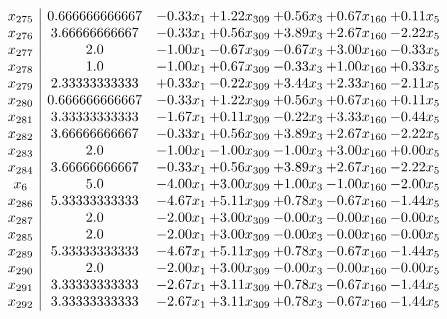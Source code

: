 \documentclass[8pt]{article}
\begin{document}
\[\begin{array}{c| c c@{\hskip 2pt} c@{\hskip 2pt} c@{\hskip 2pt} c@{\hskip 2pt} c@{\hskip 2pt} }
 x_{275}   &  0.666666666667 & -0.33 x_{1} & +  1.22 x_{309} & +  0.56 x_{3} & +  0.67 x_{160} & +  0.11 x_{5}\\
 x_{276}   &  3.66666666667 & -0.33 x_{1} & +  0.56 x_{309} & +  3.89 x_{3} & +  2.67 x_{160} & -2.22 x_{5}\\
 x_{277}   &  2.0 & -1.00 x_{1} & -0.67 x_{309} & -0.67 x_{3} & +  3.00 x_{160} & -0.33 x_{5}\\
 x_{278}   &  1.0 & -1.00 x_{1} & +  0.67 x_{309} & -0.33 x_{3} & +  1.00 x_{160} & +  0.33 x_{5}\\
 x_{279}   &  2.33333333333 & +  0.33 x_{1} & -0.22 x_{309} & +  3.44 x_{3} & +  2.33 x_{160} & -2.11 x_{5}\\
 x_{280}   &  0.666666666667 & -0.33 x_{1} & +  1.22 x_{309} & +  0.56 x_{3} & +  0.67 x_{160} & +  0.11 x_{5}\\
 x_{281}   &  3.33333333333 & -1.67 x_{1} & +  0.11 x_{309} & -0.22 x_{3} & +  3.33 x_{160} & -0.44 x_{5}\\
 x_{282}   &  3.66666666667 & -0.33 x_{1} & +  0.56 x_{309} & +  3.89 x_{3} & +  2.67 x_{160} & -2.22 x_{5}\\
 x_{283}   &  2.0 & -1.00 x_{1} & -1.00 x_{309} & -1.00 x_{3} & +  3.00 x_{160} & +  0.00 x_{5}\\
 x_{284}   &  3.66666666667 & -0.33 x_{1} & +  0.56 x_{309} & +  3.89 x_{3} & +  2.67 x_{160} & -2.22 x_{5}\\
 x_{6}   &  5.0 & -4.00 x_{1} & +  3.00 x_{309} & +  1.00 x_{3} & -1.00 x_{160} & -2.00 x_{5}\\
 x_{286}   &  5.33333333333 & -4.67 x_{1} & +  5.11 x_{309} & +  0.78 x_{3} & -0.67 x_{160} & -1.44 x_{5}\\
 x_{287}   &  2.0 & -2.00 x_{1} & +  3.00 x_{309} & -0.00 x_{3} & -0.00 x_{160} & -0.00 x_{5}\\
 x_{285}   &  2.0 & -2.00 x_{1} & +  3.00 x_{309} & -0.00 x_{3} & -0.00 x_{160} & -0.00 x_{5}\\
 x_{289}   &  5.33333333333 & -4.67 x_{1} & +  5.11 x_{309} & +  0.78 x_{3} & -0.67 x_{160} & -1.44 x_{5}\\
 x_{290}   &  2.0 & -2.00 x_{1} & +  3.00 x_{309} & -0.00 x_{3} & -0.00 x_{160} & -0.00 x_{5}\\
 x_{291}   &  3.33333333333 & -2.67 x_{1} & +  3.11 x_{309} & +  0.78 x_{3} & -0.67 x_{160} & -1.44 x_{5}\\
 x_{292}   &  3.33333333333 & -2.67 x_{1} & +  3.11 x_{309} & +  0.78 x_{3} & -0.67 x_{160} & -1.44 x_{5}\\

\end{array}\]
\end{document}
